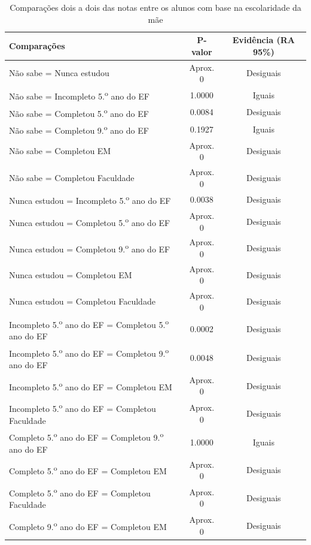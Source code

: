 \begin{table}[htb]
    \centering
\caption{\label{tab:esc_mae_notas}Comparações dois a dois das notas entre os alunos com base na escolaridade da mãe}
    \begin{tabular}{lcc}
    \toprule
    Comparações & P-valor & Evidência (RA 95\%)\\
    \midrule \midrule
    Não sabe = Nunca estudou & Aprox. 0 & Desiguais\\
    Não sabe = Incompleto 5.\textsuperscript{o} ano do EF  & 1.0000 & Iguais\\
    Não sabe = Completou 5.\textsuperscript{o} ano do EF  & 0.0084 & Desiguais\\
    Não sabe = Completou 9.\textsuperscript{o} ano do EF  & 0.1927 & Iguais\\
    Não sabe = Completou EM & Aprox. 0 & Desiguais\\
    Não sabe = Completou Faculdade & Aprox. 0 & Desiguais\\
    Nunca estudou = Incompleto 5.\textsuperscript{o} ano do EF  & 0.0038 & Desiguais\\
    Nunca estudou = Completou 5.\textsuperscript{o} ano do EF  & Aprox. 0 & Desiguais\\
    Nunca estudou = Completou 9.\textsuperscript{o} ano do EF  & Aprox. 0 & Desiguais\\
    Nunca estudou = Completou EM & Aprox. 0 & Desiguais\\
    Nunca estudou = Completou Faculdade & Aprox. 0 & Desiguais\\
    Incompleto 5.\textsuperscript{o} ano do EF = Completou 5.\textsuperscript{o} ano do EF  & 0.0002 & Desiguais\\
    Incompleto 5.\textsuperscript{o} ano do EF = Completou 9.\textsuperscript{o} ano do EF  & 0.0048 & Desiguais\\
    Incompleto 5.\textsuperscript{o} ano do EF = Completou EM & Aprox. 0 & Desiguais\\
    Incompleto 5.\textsuperscript{o} ano do EF = Completou Faculdade & Aprox. 0 & Desiguais\\
    Completo 5.\textsuperscript{o} ano do EF = Completou 9.\textsuperscript{o} ano do EF  & 1.0000 & Iguais\\
    Completo 5.\textsuperscript{o} ano do EF = Completou EM & Aprox. 0 & Desiguais\\
    Completo 5.\textsuperscript{o} ano do EF = Completou Faculdade & Aprox. 0 & Desiguais\\
    Completo 9.\textsuperscript{o} ano do EF = Completou EM & Aprox. 0 & Desiguais\\

\end{tabular}
\end{table}

